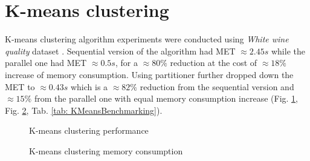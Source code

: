 \clearpage
\section{K-means clustering}
K-means clustering algorithm experiments were conducted using \emph{White wine quality} dataset \cite{WhiteWine}. Sequential version of the algorithm had MET $\approx 2.45s$ while the parallel one had MET $\approx 0.5s$, for a $\approx 80\%$ reduction at the cost of $\approx 18\%$ increase of memory consumption. Using partitioner further dropped down the MET to $\approx 0.43s$ which is a $\approx 82\%$ reduction from the sequential version and $\approx 15\%$ from the parallel one with equal memory consumption increase (Fig. \ref{fig: KMeansPerformance}, Fig. \ref{fig: KMeansMemory}, Tab. \ref{tab: KMeansBenchmarking}).

\begin{figure}[!ht]
\centering
{}
\caption{K-means clustering  performance}
\label{fig: KMeansPerformance}
\end{figure}

\begin{figure}[!ht]
\centering
{}
\caption{K-means clustering memory consumption}
\label{fig: KMeansMemory}
\end{figure}

